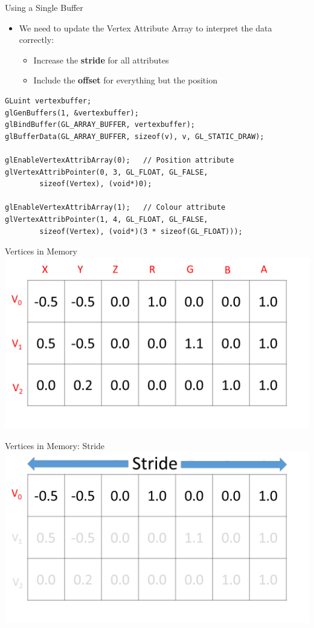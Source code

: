 \begin{frame}[fragile]{Using a Single Buffer}
	\begin{itemize}
		\pause\item We need to update the Vertex Attribute Array to interpret the data correctly:
		\begin{itemize}
			\pause\item Increase the \textbf{stride} for all attributes
			\pause\item Include the \textbf{offset} for everything but the position
		\end{itemize}
	\end{itemize}
	\pause\begin{lstlisting}
GLuint vertexbuffer;
glGenBuffers(1, &vertexbuffer);
glBindBuffer(GL_ARRAY_BUFFER, vertexbuffer);
glBufferData(GL_ARRAY_BUFFER, sizeof(v), v, GL_STATIC_DRAW);

glEnableVertexAttribArray(0);	// Position attribute
glVertexAttribPointer(0, 3, GL_FLOAT, GL_FALSE,
		sizeof(Vertex), (void*)0);

glEnableVertexAttribArray(1);	// Colour attribute
glVertexAttribPointer(1, 4, GL_FLOAT, GL_FALSE,
		sizeof(Vertex), (void*)(3 * sizeof(GL_FLOAT)));
	\end{lstlisting}
\end{frame}

\begin{frame}{Vertices in Memory}
	\includegraphics[width=1\textwidth]{MemoryLayoutValues}	
\end{frame}

\begin{frame}{Vertices in Memory: Stride}
	\includegraphics[width=1\textwidth]{MemoryLayoutStride}	
\end{frame}

